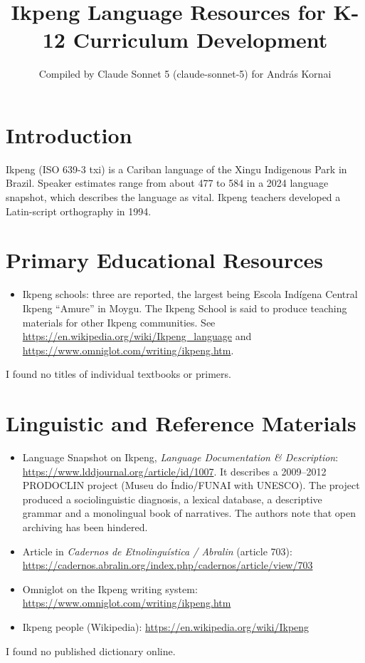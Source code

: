 \documentclass[12pt]{article}
\title{Ikpeng Language Resources for K-12 Curriculum Development}
\author{Compiled by Claude Sonnet 5 (claude-sonnet-5) for Andr\'as Kornai}
\date{}
\begin{document}
\maketitle

\section{Introduction}
Ikpeng (ISO 639-3 txi) is a Cariban language of the Xingu Indigenous Park in Brazil. Speaker estimates range from about 477 to 584 in a 2024 language snapshot, which describes the language as vital. Ikpeng teachers developed a Latin-script orthography in 1994.

\section{Primary Educational Resources}
\begin{itemize}
\item Ikpeng schools: three are reported, the largest being Escola Ind\'igena Central Ikpeng ``Amure'' in Moygu. The Ikpeng School is said to produce teaching materials for other Ikpeng communities. See \url{https://en.wikipedia.org/wiki/Ikpeng_language} and \url{https://www.omniglot.com/writing/ikpeng.htm}.
\end{itemize}
I found no titles of individual textbooks or primers.

\section{Linguistic and Reference Materials}
\begin{itemize}
\item Language Snapshot on Ikpeng, \emph{Language Documentation \& Description}: \url{https://www.lddjournal.org/article/id/1007}. It describes a 2009--2012 PRODOCLIN project (Museu do \'Indio/FUNAI with UNESCO). The project produced a sociolinguistic diagnosis, a lexical database, a descriptive grammar and a monolingual book of narratives. The authors note that open archiving has been hindered.
\item Article in \emph{Cadernos de Etnolingu\'istica / Abralin} (article 703): \url{https://cadernos.abralin.org/index.php/cadernos/article/view/703}
\item Omniglot on the Ikpeng writing system: \url{https://www.omniglot.com/writing/ikpeng.htm}
\item Ikpeng people (Wikipedia): \url{https://en.wikipedia.org/wiki/Ikpeng}
\end{itemize}
I found no published dictionary online.
\end{document}
